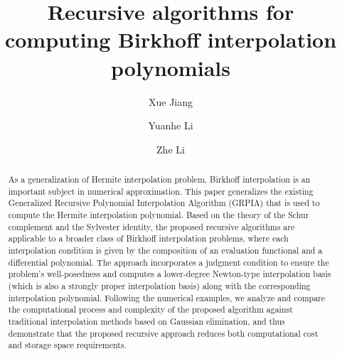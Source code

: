 \documentclass[preprint,12pt]{elsarticle}
\begin{document}
\begin{frontmatter}



\title{Recursive algorithms for computing Birkhoff interpolation polynomials}


\author{Xue Jiang}
\author{Yuanhe Li}
\author{Zhe Li} 
\begin{abstract}
As a generalization of Hermite interpolation problem, Birkhoff interpolation is an important subject in numerical approximation. This paper generalizes the existing Generalized Recursive Polynomial Interpolation Algorithm (GRPIA) that is used to compute the Hermite interpolation polynomial. Based on the theory of the Schur complement and the Sylvester identity, the proposed recursive algorithms are applicable to a broader class of Birkhoff interpolation problems, where each interpolation condition is given by the composition of an evaluation functional and a differential polynomial. The approach incorporates a judgment condition to ensure the problem's well-posedness and computes a lower-degree Newton-type interpolation basis (which is also a strongly proper interpolation basis) along with the corresponding interpolation polynomial. Following the numerical examples, we analyze and compare the computational process and complexity of the proposed algorithm against traditional interpolation methods based on Gaussian elimination, and thus demonstrate that the proposed recursive approach reduces both computational cost and storage space requirements.
\end{abstract}


\end{frontmatter}
\end{document}
